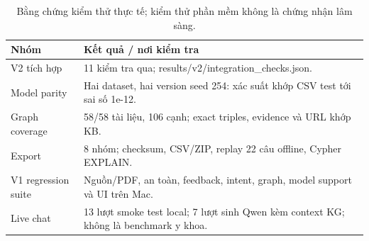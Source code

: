 \par\FloatBarrier\begin{table}[H]\centering\small{}\setlength{\tabcolsep}{5pt}
\caption{Bằng chứng kiểm thử thực tế; kiểm thử phần mềm không là chứng nhận lâm sàng.}\begin{tabular}{P{5.4cm}P{8.5cm}}\toprule
Nhóm & Kết quả / nơi kiểm tra\\\midrule
V2 tích hợp & 11 kiểm tra qua; results/v2/integration\_checks.json.\\
Model parity & Hai dataset, hai version seed 254: xác suất khớp CSV test tới sai số 1e-12.\\
Graph coverage & 58/58 tài liệu, 106 cạnh; exact triples, evidence và URL khớp KB.\\
Export & 8 nhóm; checksum, CSV/ZIP, replay 22 câu offline, Cypher EXPLAIN.\\
V1 regression suite & Nguồn/PDF, an toàn, feedback, intent, graph, model support và UI trên Mac.\\
Live chat & 13 lượt smoke test local; 7 lượt sinh Qwen kèm context KG; không là benchmark y khoa.\\\bottomrule\end{tabular}\end{table}
